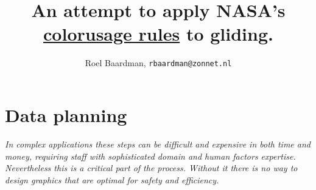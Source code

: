 \documentclass{article}
\newcommand{\myquote}[1]
{
	\textit{#1}
}
\begin{document}
\title{An attempt to apply NASA's \href{http://colorusage.arc.nasa.gov}{colorusage rules} to gliding.}
\author{Roel Baardman, \nolinkurl{rbaardman@zonnet.nl}}
\maketitle
\newpage
\tableofcontents
\newpage

\section{Data planning}
\myquote{In complex applications these steps can be difficult and expensive in both time and money, requiring staff with sophisticated domain and human factors expertise. Nevertheless this is a critical part of the process. Without it there is no way to design graphics that are optimal for safety and efficiency.}
\end{document}
